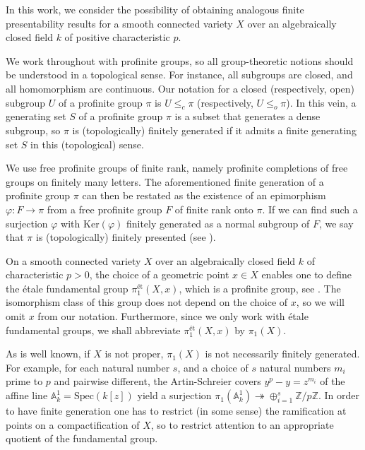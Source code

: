 \documentclass[12pt]{amsart}
\theoremstyle{plain}
\theoremstyle{definition}
\numberwithin{thm}{section}
\newcommand{\surj}{\twoheadrightarrow}
\newcommand{\Z}{{\mathbb Z}}
\numberwithin{equation}{section}
\begin{document}
In this work, we consider the possibility of obtaining analogous finite presentability results for a smooth connected variety $X$ over an algebraically closed field $k$ of positive characteristic $p$.

We  work throughout with profinite groups, so all group-theoretic notions should be understood in a topological sense.
For instance, all subgroups are closed, and all homomorphism are continuous.
Our notation for a closed (respectively, open) subgroup $U$ of a profinite group $\pi$ is $U \leq_c \pi$ (respectively, $U \leq_o \pi$).
In this vein, a generating set $S$ of a profinite group $\pi$ is a subset that generates a dense subgroup, so $\pi$ is (topologically) finitely generated if it admits a finite generating set $S$ in this (topological) sense. 


We  use free profinite groups of finite rank, namely profinite completions of free groups on finitely many letters.
The aforementioned finite generation of a profinite group $\pi$ can then be restated as the existence of an epimorphism
$
\varphi \colon F \to \pi
$
from a free profinite group $F$ of finite rank onto $\pi$. If we can find such a surjection $\varphi$ with $\mathrm{Ker}(\varphi)$ finitely generated as a normal subgroup of $F$, we say that $\pi$ is (topologically) finitely presented (see \cite[Introduction]{Lub01}).



On a smooth connected variety $X$ over an algebraically closed field $k$ of characteristic $p>0$, 
the choice of a geometric point $x \in X$ enables one to define the \'{e}tale fundamental group $\pi_1^{\text{\'{e}t}}(X,x)$, which is a profinite group, see \cite[Expos\'e~V]{SGA1}. 
The isomorphism class of this group does not depend on the choice of $x$, so we will omit $x$ from our notation. 
Furthermore, since we only work with \'{e}tale  fundamental groups, we shall abbreviate $\pi_1^{\text{\'{e}t}}(X,x)$ by $\pi_1(X)$.

As is well known,  if $X$ is not proper, $\pi_1(X)$ is not necessarily finitely generated. For example, for each natural number $s$, and a choice of $s$ natural numbers $m_i$ prime to $p$ and pairwise different, 
  the Artin-Schreier covers $y^p - y = z^{m_i}$ of the affine line $\mathbb{A}^1_k =\mathrm{Spec}(k[z])$  yield a surjection
$\pi_1(\mathbb{A}^1_k )\surj  \oplus_{i=1}^s \Z/p\Z$.
In order to have finite generation one has to restrict (in some sense) the ramification at points on a compactification of $X$,
so  to  restrict attention to an appropriate quotient of the fundamental group.  
\end{document}

